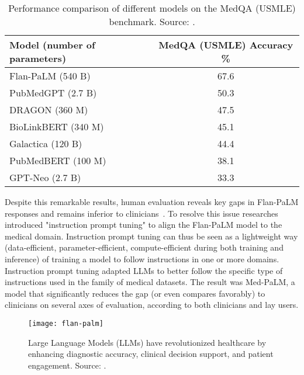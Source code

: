 \begin{table}[ht]
    \centering
    \caption{Performance comparison of different models on the MedQA (USMLE) benchmark. Source: \protect\cite{singhal2022large}.}
    \label{tab:medqa_performance}
    \begin{tabular}{@{}lc@{}}
        \toprule
        Model (number of parameters) & MedQA (USMLE) Accuracy \% \\
        \midrule
        Flan-PaLM (540 B)              & 67.6                      \\
        PubMedGPT (2.7 B)              & 50.3                      \\
        DRAGON (360 M)                 & 47.5                      \\
        BioLinkBERT (340 M)            & 45.1                      \\
        Galactica (120 B)              & 44.4                      \\
        PubMedBERT (100 M)             & 38.1                      \\
        GPT-Neo (2.7 B)                & 33.3                      \\
        \bottomrule
    \end{tabular}
\end{table}

Despite this remarkable results, human evaluation reveals key gaps in Flan-PaLM responses and remains inferior to clinicians~\cite{singhal2022large}.
To resolve this issue researches introduced "instruction prompt tuning" to align the Flan-PaLM model to the medical domain.
Instruction prompt tuning can thus be seen as a lightweight way (data-efficient, parameter-efficient, compute-efficient during both training and inference) of training a model to follow instructions in one or more domains.
Instruction prompt tuning adapted LLMs to better follow the specific type of instructions used in the family of medical datasets.
The result was Med-PaLM, a model that significantly reduces the gap (or even compares favorably) to clinicians on several axes of evaluation, according to both clinicians and lay users.

\begin{figure}[ht!]
    \centering
    \texttt{[image: flan-palm]}
    \caption{Large Language Models (LLMs) have revolutionized healthcare by enhancing diagnostic accuracy, clinical decision support, and patient engagement. Source: \protect\cite{singhal2022large}.}
    \label{fig:llm-healthcare}
\end{figure}

